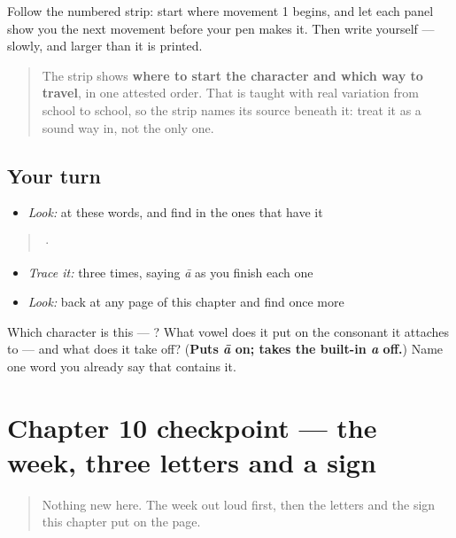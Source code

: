 Follow the numbered strip: start where movement 1 begins, and let each panel show you the next movement before your pen makes it. Then write  yourself — slowly, and larger than it is printed.

\begin{quote}
The strip shows \textbf{where to start the character and which way to travel}, in one attested order. That is taught with real variation from school to school, so the strip names its source beneath it: treat it as a sound way in, not the only one.
\end{quote}

\subsection*{Your turn}
\begin{itemize}
\raggedright
  \item \emph{Look:} at these words, and find  in the ones that have it
\end{itemize}

\begin{quote}
  ·  
\end{quote}

\begin{itemize}
\raggedright
  \item \emph{Trace it:}  three times, saying \emph{ā} as you finish each one
  \item \emph{Look:} back at any page of this chapter and find  once more
\end{itemize}

\begin{tcolorbox}[breakable,colback=teal!4,colframe=teal!35!black,title={Before you move on}]
Which character is this — ? What vowel does it put on the consonant it attaches to — and what does it take off? (\textbf{Puts \emph{ā} on; takes the built-in \emph{a} off.}) Name one word you already say that contains it.
\end{tcolorbox}
\section[Practice]{Chapter 10 checkpoint — the week, three letters and a sign}

\label{lesson:TA-C10-checkpoint}



\begin{quote}
Nothing new here. The week out loud first, then the letters and the sign this chapter put on the page.
\end{quote}

